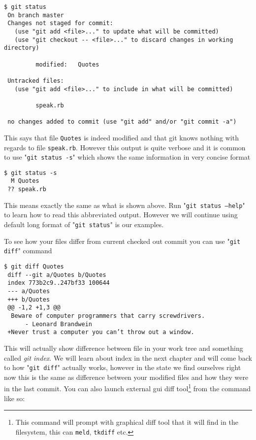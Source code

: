 \documentclass{article}
\theoremstyle{definition}
\begin{document}
        \begin{Verbatim}[frame=single]
 $ git status
 On branch master
 Changes not staged for commit:
   (use "git add <file>..." to update what will be committed)
   (use "git checkout -- <file>..." to discard changes in working directory)

         modified:   Quotes

 Untracked files:
   (use "git add <file>..." to include in what will be committed)

         speak.rb

 no changes added to commit (use "git add" and/or "git commit -a")
        \end{Verbatim}

        \noindent This says that file \texttt{Quotes} is indeed modified and that git knows nothing with regards to file
        \texttt{speak.rb}. However this output is quite verbose and it is common to use "\texttt{git status -s}" which
        shows the same information in very concise format

        \begin{Verbatim}[frame=single]
 $ git status -s
  M Quotes
 ?? speak.rb
        \end{Verbatim}
        This means exactly the same as what is shown above. Run "\texttt{git status --help}" to learn how to read this
        abbreviated output. However we will continue using default long format of "\texttt{git status}" is our examples.
        \newpage

        \noindent To see how your files differ from current checked out commit you can use "\texttt{git diff}" command
    \begin{Verbatim}[frame=single]
 $ git diff Quotes
 diff --git a/Quotes b/Quotes
 index 773b2c9..247bf33 100644
 --- a/Quotes
 +++ b/Quotes
 @@ -1,2 +1,3 @@
  Beware of computer programmers that carry screwdrivers.
      - Leonard Brandwein
 +Never trust a computer you can’t throw out a window.
        \end{Verbatim}
        This will actually show difference between file in your work tree and something called {\em git index}. We will
        learn about index in the next chapter and will come back to how "\texttt{git diff}" actually works, however in
        the state we find ourselves right now this is the same as difference between your modified files and how they
        were in the last commit. You can also launch external gui diff tool\footnote{This command will prompt with
          graphical diff tool that it will find in the filesystem, this can \texttt{meld}, \texttt{tkdiff} etc.} from
        the command like so:
\end{document}
